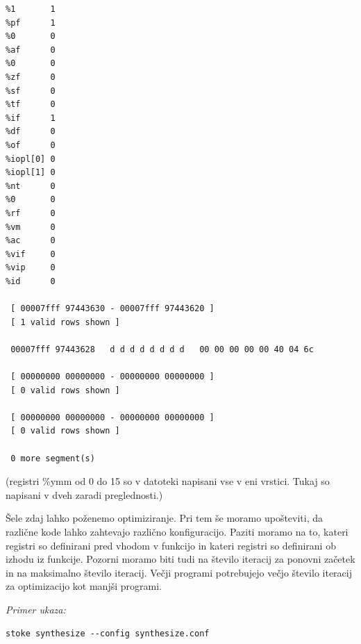 \documentclass[a4paper, 12pt]{book}
\begin{document}
\begin{Verbatim}[baselinestretch=1]
%cf      0 
%1       1 
%pf      1 
%0       0 
%af      0 
%0       0 
%zf      0 
%sf      0 
%tf      0 
%if      1 
%df      0 
%of      0 
%iopl[0] 0 
%iopl[1] 0 
%nt      0 
%0       0 
%rf      0 
%vm      0 
%ac      0 
%vif     0 
%vip     0 
%id      0 
 
 [ 00007fff 97443630 - 00007fff 97443620 ]
 [ 1 valid rows shown ]
 
 00007fff 97443628   d d d d d d d d   00 00 00 00 00 40 04 6c
 
 [ 00000000 00000000 - 00000000 00000000 ]
 [ 0 valid rows shown ]
 
 [ 00000000 00000000 - 00000000 00000000 ]
 [ 0 valid rows shown ]
 
 0 more segment(s)
 \end{Verbatim}
 \noindent
 {\small (registri \%ymm od 0 do 15 so v datoteki napisani vse v eni vrstici. Tukaj so napisani v dveh zaradi preglednosti.)}

Šele zdaj lahko poženemo optimiziranje. Pri tem še moramo upošteviti, da različne kode lahko zahtevajo različno konfiguracijo. Paziti moramo na to, kateri registri so definirani pred vhodom v funkcijo in kateri registri so definirani ob izhodu iz funkcije. Pozorni moramo biti tudi na število iteracij za ponovni začetek in na maksimalno število iteracij. Večji programi potrebujejo večjo število iteracij za optimizacijo kot manjši programi. 

\medskip

\noindent
{\it Primer ukaza:}
\begin{Verbatim}[baselinestretch=1]
stoke synthesize --config synthesize.conf
\end{Verbatim}
\medskip
\end{document}
